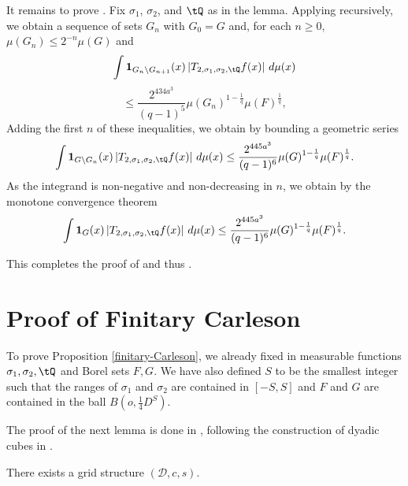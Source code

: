It remains to prove .
Fix $\sigma_1$, $\sigma_2$,
and $\tQ$ as in the lemma.
Applying  recursively, we obtain
a sequence of sets $G_n$ with $G_0=G$ and,
for each $n\ge 0$, $\mu(G_{n})\le 2^{-n} \mu(G)$ and
\begin{equation*}
    \int \mathbf{1}_{G_{n}\setminus G_{n+1}}(x)
    \left| {T}_{2,\sigma_1,\sigma_2, \tQ} f(x) \right|\, d\mu(x)
\end{equation*}
\begin{equation}
    \le \frac{2^{434a^3}}{(q-1)^5} \mu(G_n)^{1 - \frac{1}{q}} \mu(F)^{\frac{1}{q}},
\end{equation}
Adding the first $n$ of these inequalities, we obtain by bounding a geometric series
    \begin{equation} \label{Sqcut2}
    \int \mathbf{1}_{G\setminus G_{n}}(x)
\left| {T}_{2,\sigma_1,\sigma_2, \tQ}f(x) \right|\, d\mu(x)
\le \frac{2^{445a^3}}{(q-1)^6} \mu(G)^{1-\frac{1}{q}} \mu(F)^{\frac{1}{q}}.
\end{equation}
As the integrand is non-negative and non-decreasing in $n$, we obtain by the monotone convergence theorem
 \begin{equation} \label{Sqcut3}
    \int \mathbf{1}_{G}(x)
\left| {T}_{2,\sigma_1,\sigma_2, \tQ}f(x) \right|\, d\mu(x)
\le \frac{2^{445a^3}}{(q-1)^6} \mu(G)^{1-\frac{1}{q}} \mu(F)^{\frac{1}{q}}.
\end{equation}



This completes the proof of 
and thus .

\chapter{Proof of Finitary Carleson}
\label{christsection}

To prove Proposition
\ref{finitary-Carleson}, we already fixed in 
measurable functions ${\sigma_1},\sigma_2, \tQ$ and Borel sets $F,G$. We have also
defined $S$ to be the smallest
integer such that the ranges of
$\sigma_1$ and $\sigma_2$ are contained in $[-S,S]$ and $F$ and $G$ are contained
in the ball $B(o, \frac 14 D^S)$.


The proof of the next lemma is done in ,
following the construction of dyadic cubes in \cite[\S 3]{christ1990b}.

\begin{lemma}
    \label{grid-existence}
    \leanok
     There exists a grid structure $(\mathcal{D}, c,s)$.
\end{lemma}




